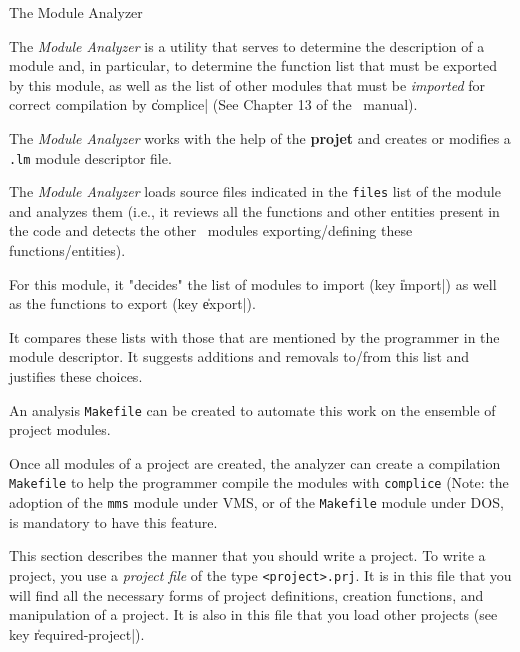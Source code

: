  {The Module Analyzer}

The {\em Module Analyzer} is a utility that serves to determine the
description of a module and, in particular, to determine the function 
list that must be exported by this module, as well as the list of
other  modules that must be {\em imported} for correct compilation by 
\|complice| (See Chapter 13 of the \LeLisp\  manual). 


The {\em Module Analyzer} works with the help of the {\bf projet} and creates or modifies a {\tt .lm} module descriptor file.

The {\em Module Analyzer} loads source files indicated in the {\tt files} list of the module and analyzes them (i.e., it reviews all the functions and other entities present in the code and detects the other \LeLisp\ modules exporting/defining these functions/entities).

For this module, it "decides" the list of modules to import (key \|import|) as well as the functions to export (key \|export|).

It compares these lists with those that are mentioned by the programmer in the module descriptor.  It suggests additions and removals to/from this list and justifies these choices.   

An analysis {\tt Makefile} can be created to automate this work on the ensemble of project modules.

Once all modules of a project are created, the analyzer can create a compilation {\tt Makefile} to help the programmer compile the modules with {\tt complice} (Note:  the adoption of the {\tt mms} module under VMS, or of the {\tt Makefile} module under DOS, is mandatory to have this feature. 


This section describes the manner that you should write a project. To write a project, you use a {\it project file} of the type {\tt <project>.prj}.  It is in this file that you will find all the necessary forms of project definitions, creation functions, and manipulation of a project.
It is also in this file that you load other projects (see key \|required-project|).

